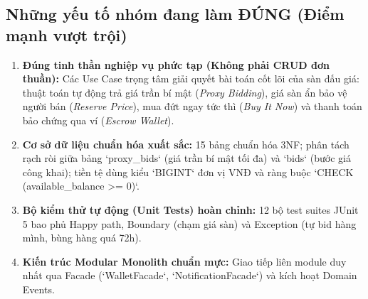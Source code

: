 \documentclass[11pt,a4paper]{article}
\begin{document}
\subsection{Những yếu tố nhóm đang làm ĐÚNG (Điểm mạnh vượt trội)}
\begin{enumerate}[leftmargin=*]
    \item \textbf{Đúng tinh thần nghiệp vụ phức tạp (Không phải CRUD đơn thuần):} Các Use Case trọng tâm giải quyết bài toán cốt lõi của sàn đấu giá: thuật toán tự động trả giá trần bí mật (\textit{Proxy Bidding}), giá sàn ẩn bảo vệ người bán (\textit{Reserve Price}), mua đứt ngay tức thì (\textit{Buy It Now}) và thanh toán bảo chứng qua ví (\textit{Escrow Wallet}).
    \item \textbf{Cơ sở dữ liệu chuẩn hóa xuất sắc:} 15 bảng chuẩn hóa 3NF; phân tách rạch ròi giữa bảng `proxy_bids` (giá trần bí mật tối đa) và `bids` (bước giá công khai); tiền tệ dùng kiểu `BIGINT` đơn vị VNĐ và ràng buộc `CHECK (available_balance >= 0)`.
    \item \textbf{Bộ kiểm thử tự động (Unit Tests) hoàn chỉnh:} 12 bộ test suites JUnit 5 bao phủ Happy path, Boundary (chạm giá sàn) và Exception (tự bid hàng mình, bùng hàng quá 72h).
    \item \textbf{Kiến trúc Modular Monolith chuẩn mực:} Giao tiếp liên module duy nhất qua Facade (`WalletFacade`, `NotificationFacade`) và kích hoạt Domain Events.
\end{enumerate}
\end{document}
